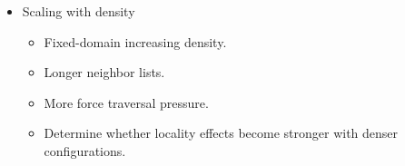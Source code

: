 \begin{itemize}
    \item Scaling with density
    \begin{itemize}
        \item Fixed-domain increasing density.
        \item Longer neighbor lists.
        \item More force traversal pressure.
        \item Determine whether locality effects become stronger with denser configurations.
    \end{itemize}
\end{itemize}
